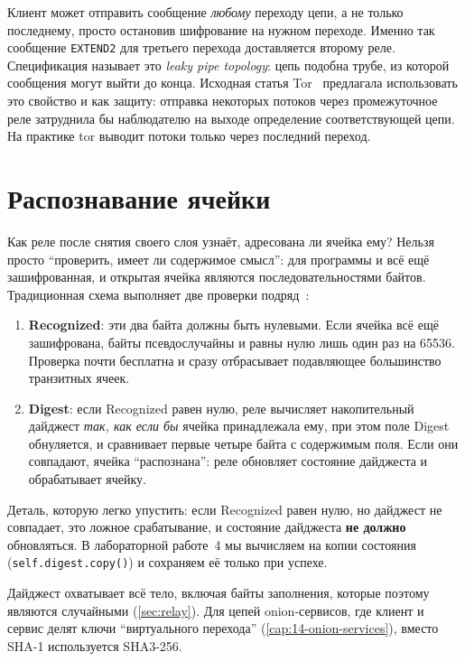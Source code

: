Клиент может отправить сообщение \emph{любому} переходу цепи, а не только последнему, просто остановив шифрование на нужном переходе. Именно так сообщение \texttt{EXTEND2} для третьего перехода доставляется второму реле. Спецификация называет это \emph{leaky pipe topology}: цепь подобна трубе, из которой сообщения могут выйти до конца. Исходная статья Tor~\cite{dingledine2004tor} предлагала использовать это свойство и как защиту: отправка некоторых потоков через промежуточное реле затруднила бы наблюдателю на выходе определение соответствующей цепи. На практике tor выводит потоки только через последний переход.

\section{Распознавание ячейки}\label{sec:riconoscere}

Как реле после снятия своего слоя узнаёт, адресована ли ячейка ему? Нельзя просто \enquote{проверить, имеет ли содержимое смысл}: для программы и всё ещё зашифрованная, и открытая ячейка являются последовательностями байтов. Традиционная схема выполняет две проверки подряд~:

\begin{enumerate}
  \item \textbf{Recognized}: эти два байта должны быть нулевыми. Если ячейка всё ещё зашифрована, байты псевдослучайны и равны нулю лишь один раз на \num{65536}. Проверка почти бесплатна и сразу отбрасывает подавляющее большинство транзитных ячеек.
  \item \textbf{Digest}: если Recognized равен нулю, реле вычисляет накопительный дайджест \emph{так, как если бы} ячейка принадлежала ему, при этом поле Digest обнуляется, и сравнивает первые четыре байта с содержимым поля. Если они совпадают, ячейка \enquote{распознана}: реле обновляет состояние дайджеста и обрабатывает ячейку.
\end{enumerate}

Деталь, которую легко упустить: если Recognized равен нулю, но дайджест не совпадает, это ложное срабатывание, и состояние дайджеста \textbf{не должно} обновляться. В лабораторной работе~4 мы вычисляем на копии состояния (\texttt{self.digest.copy()}) и сохраняем её только при успехе.

Дайджест охватывает всё тело, включая байты заполнения, которые поэтому являются случайными (\cref{sec:relay}). Для цепей onion-сервисов, где клиент и сервис делят ключи \enquote{виртуального перехода} (\cref{cap:14-onion-services}), вместо SHA-1 используется SHA3-256.

